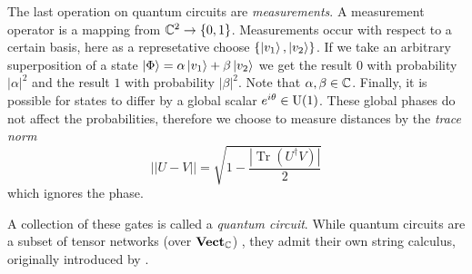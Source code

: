 The last operation on quantum circuits are \emph{measurements}. A measurement
operator is a mapping from $\mathbb{C}^2 \to \{0,1\}$. Measurements occur with respect
to a certain basis, here as a represetative choose $\{\left| v_1 \right\rangle, \left| v_2 \right\rangle\}$.
If we take an arbitrary superposition of a state $\left| \Phi \right\rangle = \alpha \left| v_1 \right\rangle
+ \beta \left| v_2 \right\rangle$ we get the result $0$ with probability $|\alpha|^2$ and the
result $1$ with probability $|\beta|^2$. Note that $\alpha,\beta \in \mathbb{C}$.
Finally, it is possible for states to differ by a global scalar $e^{i\theta} \in
\mathrm{U}(1)$. These global phases do not affect the probabilities, therefore we choose
to measure distances by the \emph{trace norm}
\[
  ||U - V|| = \sqrt{1 - \frac{|\mathop{Tr}(U^\dagger V)|}{2}}
\]
which ignores the phase.

A collection of these gates is called a \emph{quantum circuit}. While quantum
circuits are a subset of tensor networks (over $\mathbf{Vect_{\mathbb{C}}}$)
\cite{markovSimulatingQuantumComputation2008}, they admit their own string
calculus, originally introduced by
\textcite{deutschQuantumComputationalNetworks1989}. 
